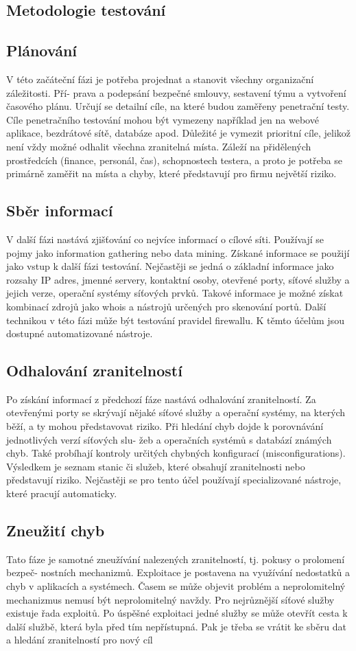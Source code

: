 \documentclass{article}
\begin{document}
\begin{large}
\section{Metodologie testování}
\subsection{Plánování}
V této začáteční fázi je potřeba projednat a stanovit všechny organizační záležitosti. Pří-
prava a podepsání bezpečné smlouvy, sestavení týmu a vytvoření časového plánu.
Určují se detailní cíle, na které budou zaměřeny penetrační testy. Cíle penetračního
testování mohou být vymezeny například jen na webové aplikace, bezdrátové sítě, databáze
apod. Důležité je vymezit prioritní cíle, jelikož není vždy možné odhalit všechna zranitelná
místa. Záleží na přidělených prostředcích (finance, personál, čas), schopnostech testera, a
proto je potřeba se primárně zaměřit na místa a chyby, které představují pro firmu největší
riziko.
\subsection{ Sběr informací}
V další fázi nastává zjišťování co nejvíce informací o cílové síti. Používají se pojmy jako
information gathering nebo data mining. Získané informace se použijí jako vstup k další
fázi testování. Nejčastěji se jedná o základní informace jako rozsahy IP adres, jmenné
servery, kontaktní osoby, otevřené porty, síťové služby a jejich verze, operační systémy
síťových prvků. Takové informace je možné získat kombinací zdrojů jako whois a nástrojů
určených pro skenování portů. Další technikou v této fázi může být testování pravidel firewallu. K těmto účelům jsou dostupné automatizované nástroje.
\subsection{ Odhalování zranitelností}
Po získání informací z předchozí fáze nastává odhalování zranitelností. Za otevřenými
porty se skrývají nějaké síťové služby a operační systémy, na kterých běží, a ty mohou
představovat riziko. Při hledání chyb dojde k porovnávání jednotlivých verzí síťových slu-
žeb a operačních systémů s databází známých chyb. Také probíhají kontroly určitých chybných
konfigurací (misconfigurations). Výsledkem je seznam stanic či služeb, které obsahují
zranitelnosti nebo představují riziko. Nejčastěji se pro tento účel používají specializované
nástroje, které pracují automaticky.
\subsection{Zneužití chyb}
Tato fáze je samotné zneužívání nalezených zranitelností, tj. pokusy o prolomení bezpeč-
nostních mechanizmů. Exploitace je postavena na využívání nedostatků a chyb v aplikacích
a systémech. Časem se může objevit problém a neprolomitelný mechanizmus nemusí být
neprolomitelný navždy. Pro nejrůznější síťové služby existuje řada exploitů.
Po úspěšné exploitaci jedné služby se může otevřít cesta k další službě, která byla před
tím nepřístupná. Pak je třeba se vrátit ke sběru dat a hledání zranitelností pro nový cíl

\end{large}
\end{document}
